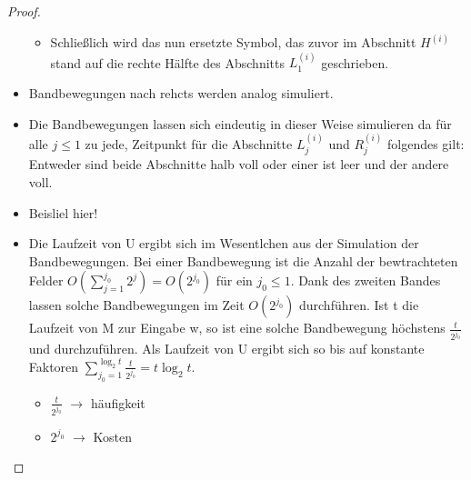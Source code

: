 \begin{proof}
\begin{itemize}
\begin{itemize}
                    \item Schließlich wird das nun ersetzte Symbol, das zuvor im Abschnitt \(H^{(i)}\) stand auf die rechte Hälfte des Abschnitts \(L_1^{(i)}\) geschrieben.
                \end{itemize}
                \item Bandbewegungen nach rehcts werden analog simuliert.
                \item Die Bandbewegungen lassen sich eindeutig in dieser Weise simulieren da für alle \( j \leq 1\) zu jede, Zeitpunkt für die Abschnitte \(L_j^{(i)}\) und \(R_j^{(i)}\) folgendes gilt: Entweder sind beide Abschnitte halb voll oder einer ist leer und der andere voll.
                \item Beisliel hier!
                \item Die Laufzeit von U ergibt sich im Wesentlchen aus der Simulation der Bandbewegungen. Bei einer Bandbewegung ist die Anzahl der bewtrachteten Felder \(O(\sum\limits_{j = 1}^{j_0} 2^j) = O(2^{j_0})\) für ein \(j_0 \leq 1\). Dank des zweiten Bandes lassen solche Bandbewegungen im Zeit \(O(2^{j_0})\) durchführen. Ist t die Laufzeit von M zur Eingabe w, so ist eine solche Bandbewegung höchstens \(\frac{t}{2^{j_0}}\) und durchzuführen. Als Laufzeit von U ergibt sich so bis auf konstante Faktoren \(\sum\limits_{j_0 = 1}^{\log_2 t} \frac{t}{2^{j_0}} = t\log_2 t\).
                \begin{itemize}
                    \item \(\frac{t}{2^{j_0}}\) \(\to\) häufigkeit
                    \item \(2^{j_0}\) \(\to \) Kosten
                \end{itemize}
            \end{itemize}
    \end{proof}